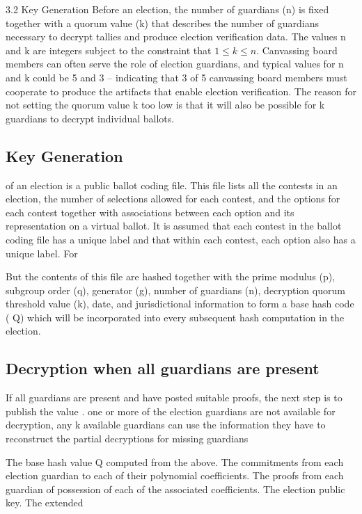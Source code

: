 3.2 Key Generation Before an election, the number of guardians (n) is fixed together with a quorum value (k) that
describes the number of guardians necessary to decrypt tallies and produce election verification data. The values n and
k are integers subject to the constraint that $1 \leq k \leq n$. Canvassing board members can often serve the role of election
guardians, and typical values for n and k could be 5 and 3 – indicating that 3 of 5 canvassing board members must
cooperate to produce the artifacts that enable election verification. The reason for not setting the quorum value k too
low is that it will also be possible for k guardians to decrypt individual ballots.
\cite[8]{eg-spec}


\subsection{Key Generation}
of an election is a public ballot coding file. This file lists all the contests in an election, the number of selections
allowed for each contest, and the options for each contest together with associations between each option and its
representation on a virtual ballot. It is assumed that each contest in the ballot coding file has a unique label and
that within each contest, each option also has a unique label. For
\cite[8]{eg-spec}

But the contents of this file are hashed together with the prime modulus (p), subgroup order (q), generator (g), number
of guardians (n), decryption quorum threshold value (k), date, and jurisdictional information to form a base hash code (
Q) which will be incorporated into every subsequent hash computation in the election.
\cite[8]{eg-spec}

\subsection{Decryption when all guardians are present}
If all guardians are present and have posted suitable proofs, the next step is to publish the value
\cite[19]{eg-spec}.
one or more of the election guardians are not available for decryption, any k available guardians can use the
information they have to reconstruct the partial decryptions for missing guardians
\cite[19]{eg-spec}

The base hash value Q computed from the above. The commitments from each election guardian to each of their polynomial
coefficients. The proofs from each guardian of possession of each of the associated coefficients. The election public
key. The extended
\cite[24]{eg-spec}


